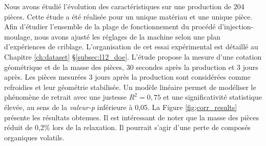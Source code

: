 Nous avons étudié l'évolution des caractéristiques sur une production de 204 pièces.
Cette étude a été réalisée pour un unique matériau et une unique pièce.
Afin d'étudier l'ensemble de la plage de fonctionnement du procédé d'injection-moulage, nous avons ajusté les réglages de la machine selon une plan d'expériences de criblage.
L'organisation de cet essai expérimental est détaillé au Chapitre \ref{ch:dataset} §\ref{subsec:l12_doe}.
L'étude propose la mesure d'une cotation géométrique et de la masse des pièces, 30 secondes après la production et 3 jours après.
Les pièces mesurées 3 jours après la production sont considérées comme refroidies et leur géométrie stabilisée.
Un modèle linéaire permet de modéliser le phénomène de retrait avec une justesse $R^2 = 0,75$ et une significativité statistique élevée, au sens de la \textit{valeur-p} inférieure à 0,05.
La Figure \ref{fig;corr_results} présente les résultats obtenues.
Il est intéressant de noter que la masse des pièces réduit de 0,2\% lors de la relaxation.
Il pourrait s'agir d'une perte de composés organiques volatils.


